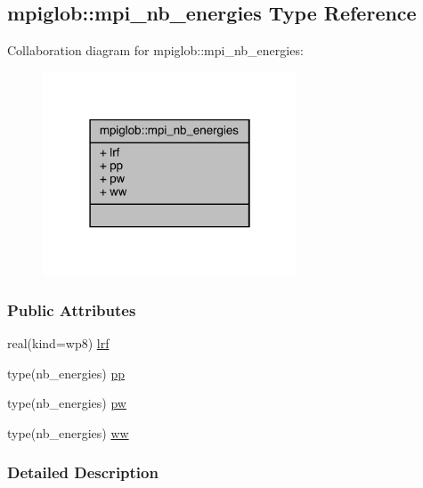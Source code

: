 \hypertarget{structmpiglob_1_1mpi__nb__energies}{\subsection{mpiglob\-:\-:mpi\-\_\-nb\-\_\-energies Type Reference}
\label{structmpiglob_1_1mpi__nb__energies}
}


Collaboration diagram for mpiglob\-:\-:mpi\-\_\-nb\-\_\-energies\-:
\nopagebreak
\begin{figure}[H]
\begin{center}
\leavevmode
\includegraphics[width=214pt]{structmpiglob_1_1mpi__nb__energies__coll__graph}
\end{center}
\end{figure}
\subsubsection*{Public Attributes}
\begin{DoxyCompactItemize}
\item 
real(kind=wp8) \hyperlink{structmpiglob_1_1mpi__nb__energies_a19fe251f3a5deebca01f830ae65c6f82}{lrf}
\item 
type(nb\-\_\-energies) \hyperlink{structmpiglob_1_1mpi__nb__energies_a73129e8f9a9f28ee2faeb1a0f41daf61}{pp}
\item 
type(nb\-\_\-energies) \hyperlink{structmpiglob_1_1mpi__nb__energies_ac275b878005f8f193e0b963b6a934178}{pw}
\item 
type(nb\-\_\-energies) \hyperlink{structmpiglob_1_1mpi__nb__energies_a263a5bec3e70a89b0b17e7499e509554}{ww}
\end{DoxyCompactItemize}


\subsubsection{Detailed Description}


